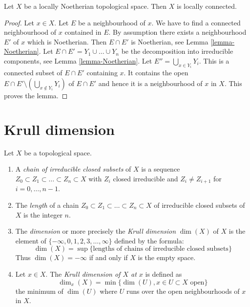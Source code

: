 \begin{lemma}
\label{lemma-locally-Noetherian-locally-connected}
Let $X$ be a locally Noetherian topological space.
Then $X$ is locally connected.
\end{lemma}

\begin{proof}
Let $x \in X$. Let $E$ be a neighbourhood of $x$.
We have to find a connected neighbourhood of $x$ contained
in $E$. By assumption there exists a neighbourhood $E'$ of $x$
which is Noetherian. Then $E \cap E'$ is Noetherian, see
Lemma \ref{lemma-Noetherian}.
Let $E \cap E' = Y_1 \cup \ldots \cup Y_n$ be the decomposition
into irreducible components, see
Lemma \ref{lemma-Noetherian}.
Let $E'' = \bigcup_{x \in Y_i} Y_i$. This is a connected
subset of $E \cap E'$ containing $x$. It contains the open
$E \cap E' \setminus (\bigcup_{x \not \in Y_i} Y_i)$ of $E \cap E'$
and hence it is a neighbourhood of $x$ in $X$. This proves the lemma.
\end{proof}



\section{Krull dimension}
\label{section-krull-dimension}

\begin{definition}
\label{definition-Krull}
Let $X$ be a topological space.
\begin{enumerate}
\item A {\it chain of irreducible closed subsets} of $X$
is a sequence $Z_0 \subset Z_1 \subset \ldots \subset Z_n \subset X$
with $Z_i$ closed irreducible and $Z_i \not = Z_{i + 1}$ for
$i = 0, \ldots, n - 1$.
\item The {\it length} of a chain
$Z_0 \subset Z_1 \subset \ldots \subset Z_n \subset X$
of irreducible closed subsets of $X$ is the
integer $n$.
\item The {\it dimension} or more precisely the {\it Krull dimension}
$\dim(X)$ of $X$ is the element of
$\{-\infty, 0, 1, 2, 3, \ldots, \infty\}$ defined by the formula:
$$
\dim(X) =
\sup \{\text{lengths of chains of irreducible closed subsets}\}
$$
Thus $\dim(X) = -\infty$ if and only if $X$ is the empty space.
\item Let $x \in X$.
The {\it Krull dimension of $X$ at $x$} is defined as
$$
\dim_x(X) = \min \{\dim(U), x\in U\subset X\text{ open}\}
$$
the minimum of $\dim(U)$ where $U$ runs over the open
neighbourhoods of $x$ in $X$.
\end{enumerate}
\end{definition}

